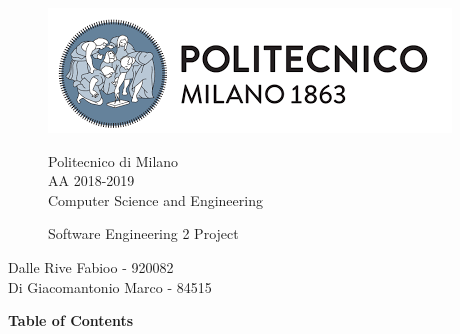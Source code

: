 \documentclass{article}
\begin{document}
\begin{figure}[t!]
	\includegraphics[width= \linewidth]{PolimiLogo.png}
	\begin{center}
	Politecnico di Milano\\[4pt]
	AA 2018-2019  \\[4pt]
	Computer Science and Engineering \\[4pt]
	\begin{large}
	Software Engineering 2 Project
	\end{large}
	\end{center}
\end{figure}
\begin{flushright}
\begin{large}
Dalle Rive Fabioo - 920082 \\[4pt]
Di Giacomantonio Marco - 84515 \\[4pt]
\end{large}
\end{flushright}
\newpage
\textbf{Table of Contents}
\end{document}
